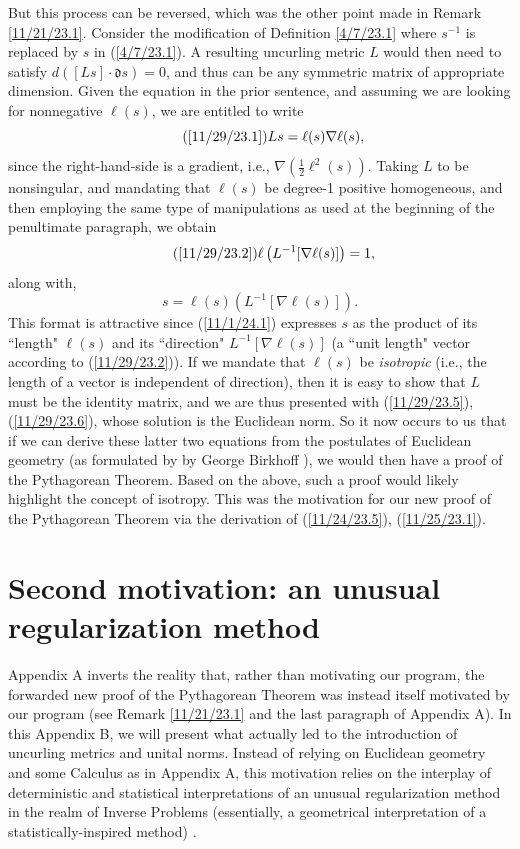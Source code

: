 \documentclass{amsart}
\numberwithin{equation}{section}
\theoremstyle{definition}
\numberwithin{theorem}{section}
\begin{document}
But this process can be reversed, which was the other point made in Remark \ref{11/21/23.1}.  Consider the modification of Definition \ref{4/7/23.1} where $s^{-1}$ is replaced by $s$ in (\ref{4/7/23.1}).  A resulting uncurling metric $L$ would then need to satisfy $d([Ls]\cdot \mathfrak{d}s)=0$, and thus can be any symmetric matrix of appropriate dimension.  Given the equation in the prior sentence, and assuming we are looking for nonnegative $\ell(s)$, we are entitled to write \begin{equation}\tag{\ref{11/29/23.1}} Ls = \ell(s)\nabla\ell(s),\end{equation} since the right-hand-side is a gradient, i.e., $\nabla(\frac{1}{2}\ell^2(s))$.  
Taking $L$ to be nonsingular, and mandating that $\ell(s)$ be degree-1 positive homogeneous, and then employing the same type of manipulations as used at the beginning of the penultimate paragraph, we obtain \begin{equation}\tag{\ref{11/29/23.2}}\ell\left(L^{-1}[\nabla\ell(s)]\right) = 1,\end{equation} along with, \begin{equation}\label{11/1/24.1} s = \ell(s)\left(L^{-1}[\nabla\ell(s)]\right).\end{equation}  
This format is attractive since (\ref{11/1/24.1}) expresses $s$ as the product of its ``length" $\ell(s)$ and its ``direction" $L^{-1}[\nabla\ell(s)]$ (a ``unit length" vector according to (\ref{11/29/23.2})).  If we mandate that $\ell(s)$ be {\it isotropic} (i.e., the length of a vector is independent of direction), then it is easy to show that $L$ must be the identity matrix, and we are thus presented with (\ref{11/29/23.5}), (\ref{11/29/23.6}), whose solution is the Euclidean norm. So it now occurs to us that if we can derive these latter two equations from the postulates of Euclidean geometry (as formulated by by George Birkhoff \cite{birkhoff:1932}), we would then have a proof of the Pythagorean Theorem.  Based on the above, such a proof would likely highlight the concept of isotropy. This was the motivation for our new proof of the Pythagorean Theorem via the derivation of (\ref{11/24/23.5}), (\ref{11/25/23.1}).
  
  

  \section{Second motivation: an unusual regularization method}
     Appendix A inverts the reality that, rather than motivating our program, the forwarded new proof of the Pythagorean Theorem was instead itself motivated by our program (see Remark \ref{11/21/23.1} and the last paragraph of Appendix A). In this Appendix B, we will present what actually led to the introduction of uncurling metrics and unital norms.  Instead of relying on Euclidean geometry and some Calculus as in Appendix A, this motivation relies on the interplay of deterministic and statistical interpretations of an unusual regularization method in the realm of Inverse Problems (essentially, a geometrical interpretation of a statistically-inspired method) \cite{fgreensite:2022d}.
  
\end{document}
